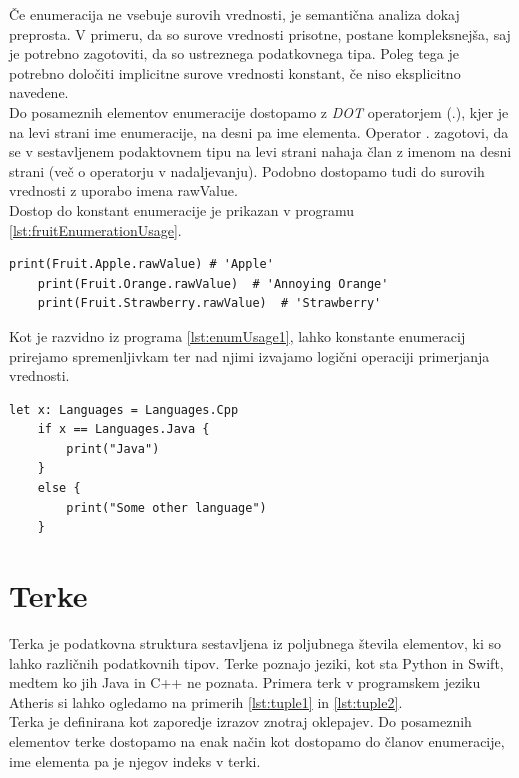 \documentclass[a4paper, 12p]{book}
\begin{document}
\indent Če enumeracija ne vsebuje surovih vrednosti, je semantična analiza dokaj preprosta. V primeru, da so surove vrednosti prisotne, postane kompleksnejša, saj je potrebno zagotoviti, da so ustreznega podatkovnega tipa. Poleg tega je potrebno določiti implicitne surove vrednosti konstant, če niso eksplicitno navedene. \\
\indent Do posameznih elementov enumeracije dostopamo z \textit{DOT} operatorjem ({\ttfamily .}), kjer je na levi strani ime enumeracije, na desni pa ime elementa. Operator {\ttfamily .} zagotovi, da se v sestavljenem podaktovnem tipu na levi strani nahaja član z imenom na desni strani (več o operatorju v nadaljevanju). Podobno dostopamo tudi do surovih vrednosti z uporabo imena {\ttfamily rawValue}. \\
\indent Dostop do konstant enumeracije je prikazan v programu \ref{lst:fruitEnumerationUsage}.

\begin{lstlisting}[caption={Izpis surovih vrednosti enumeracije ~\ref{lst:fruitEnumeration}.}, captionpos=b, label={lst:fruitEnumerationUsage}]
	print(Fruit.Apple.rawValue) # 'Apple'
	print(Fruit.Orange.rawValue)  # 'Annoying Orange'
	print(Fruit.Strawberry.rawValue)  # 'Strawberry'
\end{lstlisting}

Kot je razvidno iz programa \ref{lst:enumUsage1}, lahko konstante enumeracij prirejamo spremenljivkam ter nad njimi izvajamo logični operaciji primerjanja vrednosti.

\begin{lstlisting}[caption={Prireditev konstante enumeracije spremenljivki.}, captionpos=b, label={lst:enumUsage1}]
	let x: Languages = Languages.Cpp
	if x == Languages.Java {
	    print("Java")
	}
	else {
	    print("Some other language")
	}
\end{lstlisting}

\section{Terke}

Terka je podatkovna struktura sestavljena iz poljubnega števila elementov, ki so lahko različnih podatkovnih tipov. Terke poznajo jeziki, kot sta Python in Swift, medtem ko jih Java in C++ ne poznata. Primera terk v programskem jeziku Atheris si lahko ogledamo na primerih \ref{lst:tuple1} in \ref{lst:tuple2}. \\
\indent Terka je definirana kot zaporedje izrazov znotraj oklepajev. Do posameznih elementov terke dostopamo na enak način kot dostopamo do članov enumeracije, ime elementa pa je njegov indeks v terki. 
\end{document}
